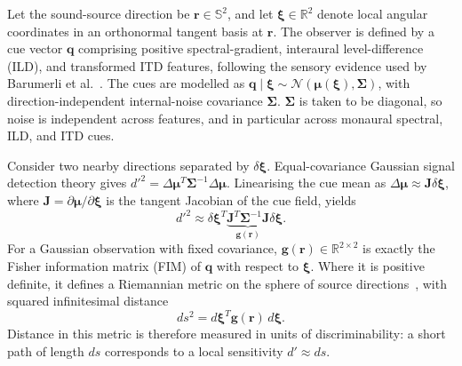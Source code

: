 \documentclass[journal]{IEEEtran}
\begin{document}
Let the sound-source direction be \(\mathbf{r}\in\mathbb{S}^2\), and let \(\boldsymbol{\xi}\in\mathbb{R}^{2}\) denote local angular coordinates in an orthonormal tangent basis at \(\mathbf{r}\). The observer is defined by a cue vector \(\mathbf q\) comprising positive spectral-gradient, interaural level-difference (ILD), and transformed ITD features, following the sensory evidence used by Barumerli et al.~\cite{Barumerli2023}. The cues are modelled as
\(\mathbf q\mid\boldsymbol{\xi}\sim
\mathcal N(\boldsymbol\mu(\boldsymbol\xi),\boldsymbol\Sigma)\),
with direction-independent internal-noise covariance \(\boldsymbol\Sigma\). \(\boldsymbol\Sigma\) is taken to be diagonal, so noise is independent across features, and in particular across monaural spectral, ILD, and ITD cues.

Consider two nearby directions separated by \(\delta\boldsymbol\xi\). Equal-covariance Gaussian signal detection theory gives
\(d'^2=\Delta\boldsymbol\mu^T\boldsymbol\Sigma^{-1}
\Delta\boldsymbol\mu\). Linearising the cue mean as
\(\Delta\boldsymbol\mu\approx\mathbf J\delta\boldsymbol\xi\), where \(\mathbf J=\partial\boldsymbol\mu/\partial\boldsymbol\xi\) is the tangent Jacobian of the cue field, yields
\begin{equation}
d'^2 \approx \delta\boldsymbol{\xi}^T
\underbrace{\mathbf J^T\boldsymbol\Sigma^{-1}\mathbf J}_{\mathbf g(\mathbf r)}
\delta\boldsymbol{\xi}.
\end{equation}
For a Gaussian observation with fixed covariance, \(\mathbf g(\mathbf r)\in\mathbb{R}^{2\times2}\) is exactly the Fisher information matrix (FIM) of \(\mathbf q\) with respect to \(\boldsymbol\xi\). Where it is positive definite, it defines a Riemannian metric on the sphere of source directions~\cite{Rao1945}, with squared infinitesimal distance
\begin{equation}
ds^2 = d\boldsymbol{\xi}^T \mathbf{g}(\mathbf{r})\, d\boldsymbol{\xi}.
\end{equation}
Distance in this metric is therefore measured in units of discriminability: a short path of length \(ds\) corresponds to a local sensitivity \(d'\approx ds\).
\end{document}
